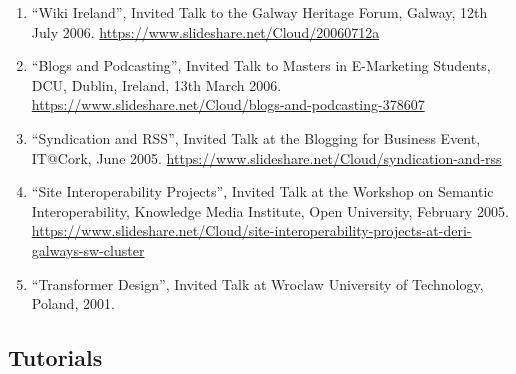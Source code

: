 \documentclass[10pt,a4paper]{res} %
\begin{document}
\begin{resume}
\begin{enumerate}
\item ``Wiki Ireland'', Invited Talk to the Galway Heritage Forum, Galway, 12th July 2006. \url{https://www.slideshare.net/Cloud/20060712a}
\item ``Blogs and Podcasting'', Invited Talk to Masters in E-Marketing Students, DCU, Dublin, Ireland, 13th March 2006. \url{https://www.slideshare.net/Cloud/blogs-and-podcasting-378607}
\item ``Syndication and RSS'', Invited Talk at the Blogging for Business Event, IT@Cork, June 2005. \url{https://www.slideshare.net/Cloud/syndication-and-rss}
\item ``Site Interoperability Projects'', Invited Talk at the Workshop on Semantic Interoperability, Knowledge Media Institute, Open University, February 2005. \url{https://www.slideshare.net/Cloud/site-interoperability-projects-at-deri-galways-sw-cluster}
\item ``Transformer Design'', Invited Talk at Wroclaw University of Technology, Poland, 2001. %
\end{enumerate}

\subsection*{Tutorials}


\end{resume}
\end{document}
